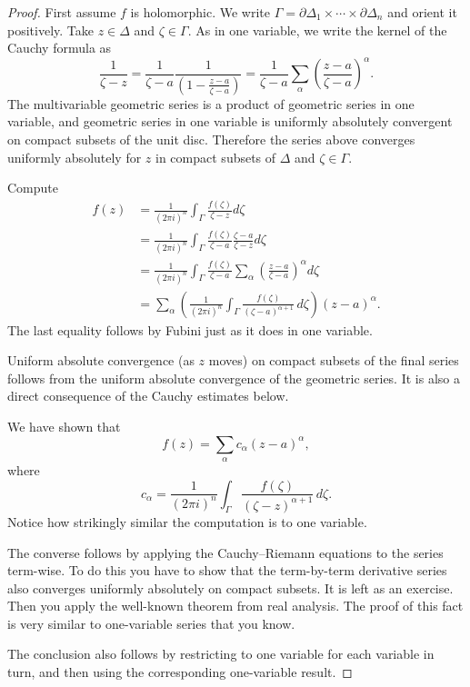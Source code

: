 \documentclass[12pt,openany]{book}
\theoremstyle{plain}
\theoremstyle{remark}
\theoremstyle{definition}
\theoremstyle{exercise}
\theoremstyle{example}
\begin{document}
\begin{proof}
First assume $f$ is holomorphic.
We write
$\Gamma = \partial \Delta_1 \times \cdots \times \partial \Delta_n$
and orient it positively.
Take $z \in \Delta$ and $\zeta \in \Gamma$.
As in one variable, we write the kernel of the Cauchy
formula as
\begin{equation*}
\frac{1}{\zeta-z} =
\frac{1}{\zeta-a}\frac{1}{\left(1-\frac{z-a}{\zeta-a}\right)} =
\frac{1}{\zeta-a}
\sum_{\alpha}
{\left(\frac{z-a}{\zeta-a}\right)}^\alpha .
\end{equation*}
The multivariable geometric series is a product of geometric series
in one variable, and geometric series in one variable
is uniformly absolutely convergent on compact subsets of the unit disc.
Therefore the series
above converges uniformly absolutely for $z$ in compact subsets of $\Delta$
and $\zeta \in \Gamma$.

Compute
\begin{equation*}
\begin{split}
f(z)
& =
\frac{1}{{(2\pi i)}^n}
\int_{\Gamma}
\frac{f(\zeta)}{\zeta-z}
d \zeta 
\\
& =
\frac{1}{{(2\pi i)}^n}
\int_{\Gamma}
\frac{f(\zeta)}{\zeta-a}
\frac{\zeta-a}{\zeta-z}
d \zeta 
\\
& =
\frac{1}{{(2\pi i)}^n}
\int_{\Gamma}
\frac{f(\zeta)}{\zeta-a}
\sum_{\alpha}
{\left(\frac{z-a}{\zeta-a}\right)}^{\alpha}
d \zeta 
\\
& =
\sum_{\alpha}
\left(
\frac{1}{{(2\pi i)}^n}
\int_{\Gamma}
\frac{f(\zeta)}{{(\zeta-a)}^{\alpha+1}}
\,
d \zeta 
\right)
{(z-a)}^{\alpha} .
\end{split}
\end{equation*}
The last equality follows by Fubini just as it does in one variable.

Uniform absolute convergence (as $z$ moves) on compact subsets of the final
series follows from the
uniform absolute convergence of the geometric series.  It is also a direct
consequence of the Cauchy estimates below.

We have shown that
\begin{equation*}
f(z) =
\sum_{\alpha}
c_{\alpha}
{(z-a)}^{\alpha} ,
\end{equation*}
where
\begin{equation*}
c_\alpha
=
\frac{1}{{(2\pi i)}^n}
\int_{\Gamma}
\frac{f(\zeta)}{{(\zeta-z)}^{\alpha+1}}
\,
d \zeta .
\end{equation*}
Notice how strikingly similar the computation is to one variable.

The converse follows by applying the Cauchy--Riemann equations to the series
term-wise.  To do this you have to show that the term-by-term derivative
series also converges uniformly absolutely on compact subsets.  It is left as an
exercise.  Then you apply the well-known theorem from real analysis.
The proof of this fact is very similar to one-variable series that you know.

The conclusion also follows by restricting to one variable for each variable
in turn, and then using the corresponding one-variable result.
\end{proof}
\end{document}
